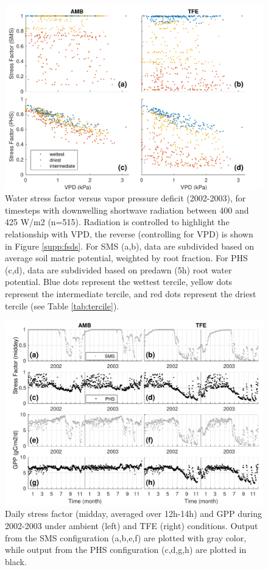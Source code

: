 \documentclass[draft,linenumbers]{agujournal}
\begin{document}
      \clearpage
    \begin{figure}[h]
     \centering
     \includegraphics[width=30pc]{../figs3/vpdstress.pdf}
     \caption{Water stress factor versus vapor pressure deficit (2002-2003), for timesteps with downwelling shortwave radiation between 400 and 425 W/m2 (n=515).
     Radiation is controlled to highlight the relationship with VPD, the reverse (controlling for VPD) is shown in Figure \ref{supp:fsds}.
     For SMS (a,b), data are subdivided based on average soil matric potential, weighted by root fraction.
     For PHS (c,d), data are subdivided based on predawn (5h) root water potential.
     Blue dots represent the wettest tercile, yellow dots represent the intermediate tercile, and red dots represent the driest tercile (see Table \ref{tab:tercile}).
     }
     \label{fig:stress2}
       \end{figure}
      
          \clearpage   
  \begin{figure}[h]
     \centering
     \includegraphics[width=30pc]{../figs3/gpp.pdf}
     \caption{Daily stress factor (midday, averaged over 12h-14h) and GPP during 2002-2003 under ambient (left) and TFE (right) conditions.
     Output from the SMS configuration (a,b,e,f) are plotted with gray color, while output from the PHS configuration (c,d,g,h) are plotted in black.
     }
     \label{fig:gpp}
  \end{figure} 
         
\end{document}
